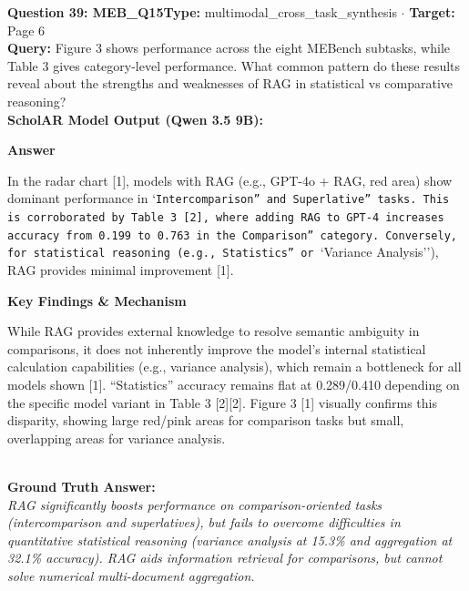 \documentclass[10pt,a4paper]{article}
\begin{document}
\begin{tcolorbox}[questionbox]
{\noindent\bfseries\large\color{navy} Question 39: MEB\_Q15}\hfill {\footnotesize\color{darkteal}\textbf{Type:} multimodal\_cross\_task\_synthesis $\cdot$ \textbf{Target:} Page 6}\\[4pt]
{\noindent\bfseries\color{accentblue} Query: } Figure 3 shows performance across the eight MEBench subtasks, while Table 3 gives category-level performance. What common pattern do these results reveal about the strengths and weaknesses of RAG in statistical vs comparative reasoning?\\[6pt]
{\noindent\bfseries\color{navy} ScholAR Model Output (Qwen 3.5 9B):}\\[2pt]
{\small \noindent \textbf{Answer}\par\vspace{3pt}In the radar chart [1], models with RAG (e.g., GPT-4o + RAG, red area) show dominant performance in `\texttt{Intercomparison'' and }\texttt{Superlative'' tasks. This is corroborated by Table 3 [2], where adding RAG to GPT-4 increases accuracy from 0.199 to 0.763 in the }\texttt{Comparison'' category. Conversely, for statistical reasoning (e.g., }\texttt{Statistics'' or }`Variance Analysis''), RAG provides minimal improvement [1].\par\vspace{3pt}\noindent \textbf{Key Findings \& Mechanism}\par\vspace{3pt}While RAG provides external knowledge to resolve semantic ambiguity in comparisons, it does not inherently improve the model's internal statistical calculation capabilities (e.g., variance analysis), which remain a bottleneck for all models shown [1]. ``Statistics'' accuracy remains flat at 0.289/0.410 depending on the specific model variant in Table 3 [2][2]. Figure 3 [1] visually confirms this disparity, showing large red/pink areas for comparison tasks but small, overlapping areas for variance analysis.}\\[6pt]
{\noindent\bfseries\color{darkteal} Ground Truth Answer:}\\[2pt]
{\small\itshape RAG significantly boosts performance on comparison-oriented tasks (intercomparison and superlatives), but fails to overcome difficulties in quantitative statistical reasoning (variance analysis at 15.3\% and aggregation at 32.1\% accuracy). RAG aids information retrieval for comparisons, but cannot solve numerical multi-document aggregation.}\\[4pt]

\end{tcolorbox}
\end{document}

